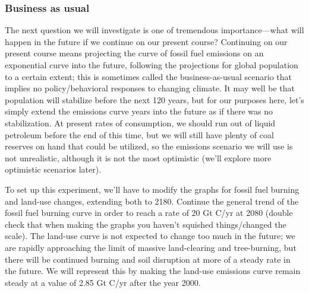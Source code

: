 \documentclass[11pt,letterpaper]{article}
\begin{document}
\subsubsection{Business as usual}
The next question we will investigate is one of tremendous importance---what will happen in the future if we continue on our present course? Continuing on our present course means projecting the curve of fossil fuel emissions on an exponential curve into the future, following the projections for global population to a certain extent; this is sometimes called the business-as-usual scenario that implies no policy/behavioral responses to changing climate. It may well be that population will stabilize before the next 120 years, but for our purposes here, let's simply extend the emissions curve years into the future as if there was no stabilization. At present rates of consumption, we should run out of liquid petroleum before the end of this time, but we will still have plenty of coal reserves on hand that could be utilized, so the emissions scenario we will use is not unrealistic, although it is not the most optimistic (we'll explore more optimistic scenarios later).

To set up this experiment, we'll have to modify the graphs for fossil fuel burning and land-use changes, extending both to 2180. Continue the general trend of the fossil fuel burning curve in order to reach a rate of 20 Gt C/yr at 2080 (double check that when making the graphs you haven't squished things/changed the scale). The land-use curve is not expected to change too much in the future; we are rapidly approaching the limit of massive land-clearing and tree-burning, but there will be continued burning and soil disruption at more of a steady rate in the future. We will represent this by making the land-use emissions curve remain steady at a value of 2.85 Gt C/yr after the year 2000. 
\end{document}
